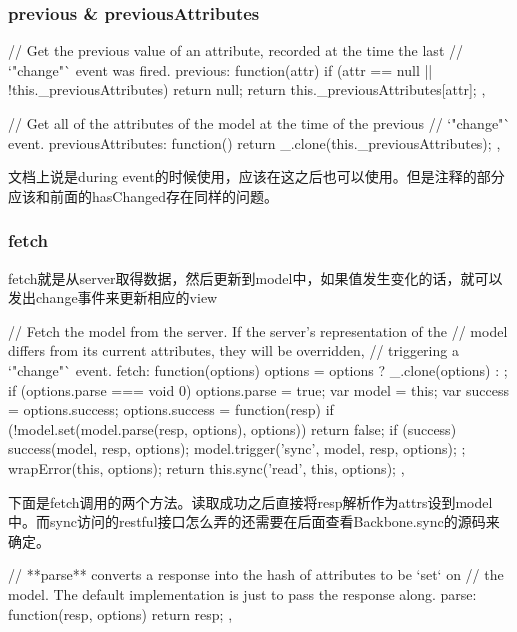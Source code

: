 \subsubsection{previous \& previousAttributes}

\begin{JavaScript}
    // Get the previous value of an attribute, recorded at the time the last
    // `"change"` event was fired.
    previous: function(attr) {
      if (attr == null || !this._previousAttributes) return null;
      return this._previousAttributes[attr];
    },

    // Get all of the attributes of the model at the time of the previous
    // `"change"` event.
    previousAttributes: function() {
      return _.clone(this._previousAttributes);
    },
\end{JavaScript}

文档上说是during event的时候使用，应该在这之后也可以使用。但是注释的部分应该和前面的hasChanged存在同样的问题。

\subsubsection{fetch}

fetch就是从server取得数据，然后更新到model中，如果值发生变化的话，就可以发出change事件来更新相应的view

\begin{JavaScript}
    // Fetch the model from the server. If the server's representation of the
    // model differs from its current attributes, they will be overridden,
    // triggering a `"change"` event.
    fetch: function(options) {
      options = options ? _.clone(options) : {};
      if (options.parse === void 0) options.parse = true;
      var model = this;
      var success = options.success;
      options.success = function(resp) {
        if (!model.set(model.parse(resp, options), options)) return false;
        if (success) success(model, resp, options);
        model.trigger('sync', model, resp, options);
      };
      wrapError(this, options);
      return this.sync('read', this, options);
    },
\end{JavaScript}

下面是fetch调用的两个方法。读取成功之后直接将resp解析作为attrs设到model中。而sync访问的restful接口怎么弄的还需要在后面查看Backbone.sync的源码来确定。

\begin{JavaScript}
    // **parse** converts a response into the hash of attributes to be `set` on
    // the model. The default implementation is just to pass the response along.
    parse: function(resp, options) {
      return resp;
    },
\end{JavaScript}

